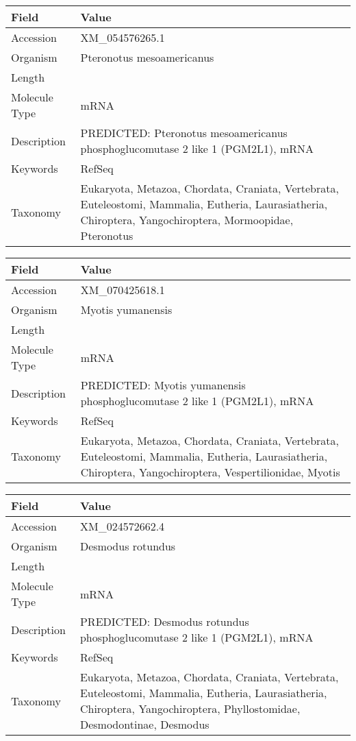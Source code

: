 \documentclass[10pt]{article}
\begin{document}
\vspace{1em}
{\footnotesize
\begin{longtable}{>{\raggedright\arraybackslash}p{4.5cm} >{\raggedright\arraybackslash}p{11.5cm}}
\textbf{Field} & \textbf{Value} \\
\hline
Accession & XM\_054576265.1 \\
Organism & Pteronotus mesoamericanus \\
Length & 7824 \\
Molecule Type & mRNA \\
Description & PREDICTED: Pteronotus mesoamericanus phosphoglucomutase 2 like 1 (PGM2L1), mRNA \\
Keywords & RefSeq \\
Taxonomy & Eukaryota, Metazoa, Chordata, Craniata, Vertebrata, Euteleostomi, Mammalia, Eutheria, Laurasiatheria, Chiroptera, Yangochiroptera, Mormoopidae, Pteronotus \\
\end{longtable}
}

\vspace{1em}
{\footnotesize
\begin{longtable}{>{\raggedright\arraybackslash}p{4.5cm} >{\raggedright\arraybackslash}p{11.5cm}}
\textbf{Field} & \textbf{Value} \\
\hline
Accession & XM\_070425618.1 \\
Organism & Myotis yumanensis \\
Length & 7638 \\
Molecule Type & mRNA \\
Description & PREDICTED: Myotis yumanensis phosphoglucomutase 2 like 1 (PGM2L1), mRNA \\
Keywords & RefSeq \\
Taxonomy & Eukaryota, Metazoa, Chordata, Craniata, Vertebrata, Euteleostomi, Mammalia, Eutheria, Laurasiatheria, Chiroptera, Yangochiroptera, Vespertilionidae, Myotis \\
\end{longtable}
}

\vspace{1em}
{\footnotesize
\begin{longtable}{>{\raggedright\arraybackslash}p{4.5cm} >{\raggedright\arraybackslash}p{11.5cm}}
\textbf{Field} & \textbf{Value} \\
\hline
Accession & XM\_024572662.4 \\
Organism & Desmodus rotundus \\
Length & 7758 \\
Molecule Type & mRNA \\
Description & PREDICTED: Desmodus rotundus phosphoglucomutase 2 like 1 (PGM2L1), mRNA \\
Keywords & RefSeq \\
Taxonomy & Eukaryota, Metazoa, Chordata, Craniata, Vertebrata, Euteleostomi, Mammalia, Eutheria, Laurasiatheria, Chiroptera, Yangochiroptera, Phyllostomidae, Desmodontinae, Desmodus \\
\end{longtable}
}
\end{document}
